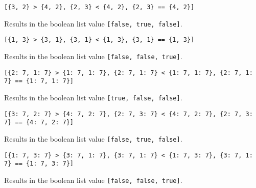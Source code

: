 {\begin{itemize}
{		\item \texttt{[\{3, 2\} > \{4, 2\}, \{2, 3\} < \{4, 2\}, \{2, 3\} == \{4, 2\}]}
		
			Results in the boolean list value \texttt{[false, true, false]}.
			
		\item \texttt{[\{1, 3\} > \{3, 1\}, \{3, 1\} < \{1, 3\}, \{3, 1\} == \{1, 3\}]}
		
			Results in the boolean list value \texttt{[false, false, true]}.
			
		\item \texttt{[\{2: 7, 1: 7\} > \{1: 7, 1: 7\}, \{2: 7, 1: 7\} < \{1: 7, 1: 7\}, \{2: 7, 1: 7\} == \{1: 7, 1: 7\}]}
		
			Results in the boolean list value \texttt{[true, false, false]}.
			
		\item \texttt{[\{3: 7, 2: 7\} > \{4: 7, 2: 7\}, \{2: 7, 3: 7\} < \{4: 7, 2: 7\}, \{2: 7, 3: 7\} == \{4: 7, 2: 7\}]}
		
			Results in the boolean list value \texttt{[false, true, false]}.
			
		\item \texttt{[\{1: 7, 3: 7\} > \{3: 7, 1: 7\}, \{3: 7, 1: 7\} < \{1: 7, 3: 7\}, \{3: 7, 1: 7\} == \{1: 7, 3: 7\}]}
		
			Results in the boolean list value \texttt{[false, false, true]}.
	}
	\end{itemize}
}



















